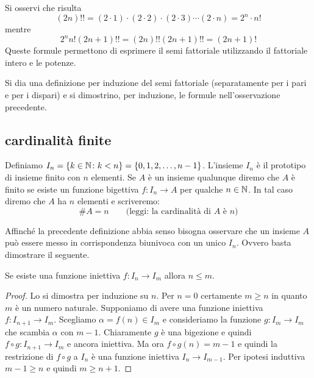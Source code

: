   \begin{remark}
  \label{rem:doppio_fattoriale}%
  Si osservi che risulta
  \[
    (2n)!! = (2\cdot 1) \cdot (2\cdot 2) \cdot (2\cdot 3) \cdots (2\cdot n)
          = 2^n \cdot n!
  \]
  mentre
  \[
    2^n n! (2n+1)!! 
    = (2n)!! (2n+1)!!
    = (2n+1)!
  \]
  Queste formule permettono di esprimere il semi fattoriale utilizzando
  il fattoriale intero e le potenze.
  \end{remark}
  
\begin{exercise}
  Si dia una definizione per induzione del semi fattoriale
  (separatamente per i pari e per i dispari)
  e si dimostrino, per induzione, le formule nell'osservazione precedente.
\end{exercise}
  
\subsection{cardinalità finite}
  
\begin{definition}
  Definiamo $I_n = {\left\{ k\in \mathbb N \colon k<n \right\}} = \{ 0,1, 2, \dots, n-1\}$.
  L'insieme $I_n$ è il prototipo di insieme finito con $n$ elementi.
  Se $A$ è un insieme qualunque diremo che $A$ è finito se esiste 
  un funzione bigettiva $f\colon I_n \to A$ per qualche $n\in \mathbb N$.
  In tal caso diremo che $A$ ha $n$ elementi e scriveremo:
  \[
    \# A = n\qquad\text{(leggi: la cardinalità di $A$ è $n$)}
  \]
\end{definition}

Affinché la precedente definizione abbia senso bisogna osservare che un insieme 
$A$ può essere messo in corrispondenza biunivoca con un unico $I_n$. 
Ovvero basta dimostrare il seguente.

\begin{lemma}
Se esiste una funzione iniettiva $f\colon I_n \to I_m$ 
allora $n\le m$. 
\end{lemma}
\begin{proof}
  Lo si dimostra per induzione su $n$. 
  Per $n=0$ certamente $m\ge n$ in quanto $m$ è un numero naturale.
  Supponiamo di avere una funzione iniettiva $f\colon I_{n+1}\to I_m$.
  Scegliamo $\alpha = f(n) \in I_m$ e consideriamo la funzione 
  $g\colon I_m\to I_m$ che scambia $\alpha$ con $m-1$.
  Chiaramente $g$ è una bigezione e quindi $f\circ g\colon I_{n+1}\to I_m$ 
  e ancora iniettiva. 
  Ma ora $f\circ g(n)=m-1$ e quindi la restrizione di $f\circ g$ a $I_n$ è una funzione 
  iniettiva $I_n \to I_{m-1}$. Per ipotesi induttiva $m-1\ge n$ e quindi $m\ge n+1$.
\end{proof}

